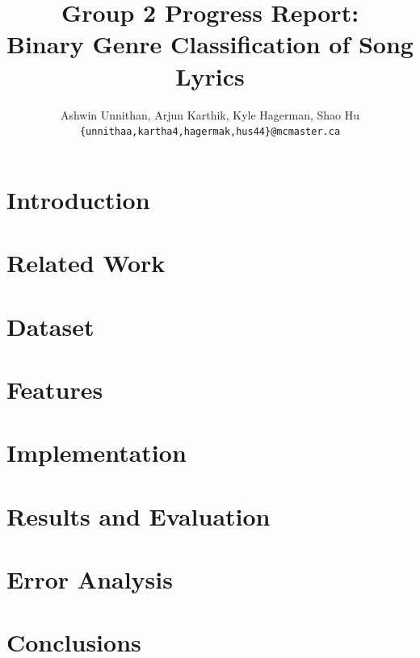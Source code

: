 \documentclass[11pt]{article}
\title{Group 2 Progress Report:\\Binary Genre Classification of Song Lyrics}
\author{Ashwin Unnithan, Arjun Karthik, Kyle Hagerman, Shao Hu\\
  \texttt{\{unnithaa,kartha4,hagermak,hus44\}@mcmaster.ca} }
\begin{document}
\maketitle

\section{Introduction}



\section{Related Work}



\section{Dataset}



\section{Features}



\section{Implementation}



\section{Results and Evaluation}





\section{Error Analysis}



\section{Conclusions}
\end{document}
